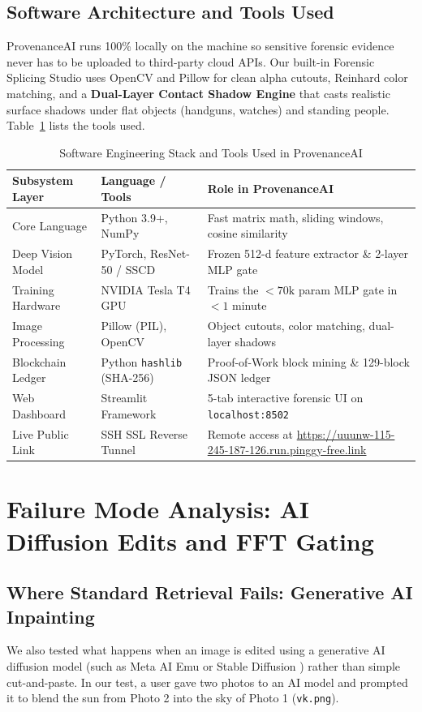 \documentclass[12pt,a4paper]{article}
\begin{document}
\subsection{Software Architecture and Tools Used}
ProvenanceAI runs 100\% locally on the machine so sensitive forensic evidence never has to be uploaded to third-party cloud APIs. Our built-in Forensic Splicing Studio uses OpenCV and Pillow for clean alpha cutouts, Reinhard color matching, and a \textbf{Dual-Layer Contact Shadow Engine} that casts realistic surface shadows under flat objects (handguns, watches) and standing people. Table~\ref{tab:stack} lists the tools used.

\begin{table}[h]
\centering
\small
\begin{tabular}{p{3.2cm} p{4.2cm} p{6.8cm}}
\toprule
\textbf{Subsystem Layer} & \textbf{Language / Tools} & \textbf{Role in ProvenanceAI} \\
\midrule
Core Language & Python 3.9+, NumPy & Fast matrix math, sliding windows, cosine similarity \\
Deep Vision Model & PyTorch, ResNet-50 / SSCD & Frozen 512-d feature extractor \& 2-layer MLP gate \\
Training Hardware & NVIDIA Tesla T4 GPU & Trains the $<70\text{k}$ param MLP gate in $<1$ minute \\
Image Processing & Pillow (PIL), OpenCV & Object cutouts, color matching, dual-layer shadows \\
Blockchain Ledger & Python \texttt{hashlib} (SHA-256) & Proof-of-Work block mining \& 129-block JSON ledger \\
Web Dashboard & Streamlit Framework & 5-tab interactive forensic UI on \texttt{localhost:8502} \\
Live Public Link & SSH SSL Reverse Tunnel & Remote access at \url{https://uuunw-115-245-187-126.run.pinggy-free.link} \\
\bottomrule
\end{tabular}
\caption{Software Engineering Stack and Tools Used in ProvenanceAI}
\label{tab:stack}
\end{table}

\section{Failure Mode Analysis: AI Diffusion Edits and FFT Gating}

\subsection{Where Standard Retrieval Fails: Generative AI Inpainting}
We also tested what happens when an image is edited using a generative AI diffusion model (such as Meta AI Emu or Stable Diffusion \cite{ldm}) rather than simple cut-and-paste. In our test, a user gave two photos to an AI model and prompted it to blend the sun from Photo 2 into the sky of Photo 1 (\texttt{vk.png}).
\end{document}
